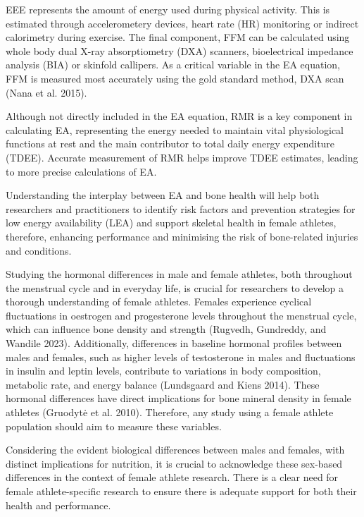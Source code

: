 \documentclass[
]{article}
\begin{document}
EEE represents the amount of energy used during physical activity. This is estimated through accelerometery devices, heart rate (HR) monitoring or indirect calorimetry during exercise. The final component, FFM can be calculated using whole body dual X-ray absorptiometry (DXA) scanners, bioelectrical impedance analysis (BIA) or skinfold callipers. As a critical variable in the EA equation, FFM is measured most accurately using the gold standard method, DXA scan (Nana et al. 2015).

Although not directly included in the EA equation, RMR is a key component in calculating EA, representing the energy needed to maintain vital physiological functions at rest and the main contributor to total daily energy expenditure (TDEE). Accurate measurement of RMR helps improve TDEE estimates, leading to more precise calculations of EA.

Understanding the interplay between EA and bone health will help both researchers and practitioners to identify risk factors and prevention strategies for low energy availability (LEA) and support skeletal health in female athletes, therefore, enhancing performance and minimising the risk of bone-related injuries and conditions.

Studying the hormonal differences in male and female athletes, both throughout the menstrual cycle and in everyday life, is crucial for researchers to develop a thorough understanding of female athletes. Females experience cyclical fluctuations in oestrogen and progesterone levels throughout the menstrual cycle, which can influence bone density and strength (Rugvedh, Gundreddy, and Wandile 2023). Additionally, differences in baseline hormonal profiles between males and females, such as higher levels of testosterone in males and fluctuations in insulin and leptin levels, contribute to variations in body composition, metabolic rate, and energy balance (Lundsgaard and Kiens 2014). These hormonal differences have direct implications for bone mineral density in female athletes (Gruodytė et al. 2010). Therefore, any study using a female athlete population should aim to measure these variables.

Considering the evident biological differences between males and females, with distinct implications for nutrition, it is crucial to acknowledge these sex-based differences in the context of female athlete research. There is a clear need for female athlete-specific research to ensure there is adequate support for both their health and performance.
\end{document}
